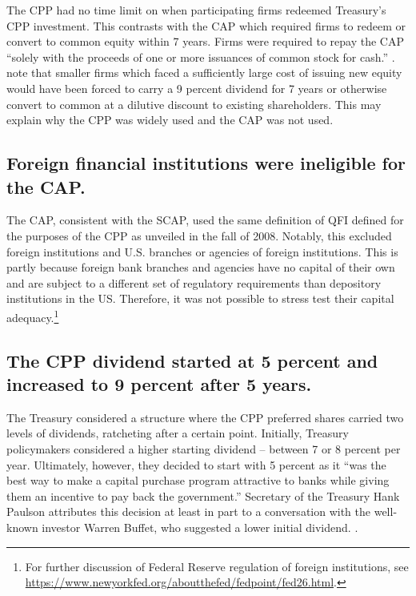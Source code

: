 \documentclass[12pt]{article}
\begin{document}
The CPP had no time limit on when participating firms redeemed Treasury's CPP investment. This contrasts with the CAP which required firms to redeem or convert to common equity within 7 years. Firms were required to repay the CAP ``solely with the proceeds of one or more issuances of common stock for cash.'' \citep{CAPTerms}. \citet{GW} note that smaller firms which faced a sufficiently large cost of issuing new equity would have been forced to carry a 9 percent dividend for 7 years or otherwise convert to common at a dilutive discount to existing shareholders. This may explain why the CPP was widely used and the CAP was not used.

\subsection{Foreign financial institutions were ineligible for the CAP.}

The CAP, consistent with the SCAP, used the same definition of QFI defined for the purposes of the CPP as unveiled in the fall of 2008. Notably, this excluded foreign institutions and U.S. branches or agencies of foreign institutions. This is partly because foreign bank branches and agencies have no capital of their own and are subject to a different set of regulatory requirements than depository institutions in the US. Therefore, it was not possible to stress test their capital adequacy.\footnote{For further discussion of Federal Reserve regulation of foreign institutions, see \url{https://www.newyorkfed.org/aboutthefed/fedpoint/fed26.html}.}

\subsection{The CPP dividend started at 5 percent and increased to 9 percent after 5 years.}

The Treasury considered a structure where the CPP preferred shares carried two levels of dividends, ratcheting after a certain point. Initially, Treasury policymakers considered a higher starting dividend -- between 7 or 8 percent per year. Ultimately, however, they decided to start with 5 percent as it ``was the best way to make a capital purchase program attractive to banks while giving them an incentive to pay back the government.'' Secretary of the Treasury Hank Paulson attributes this decision at least in part to a conversation with the well-known investor Warren Buffet, who suggested a lower initial dividend. \citep{paulsonbook}.
\end{document}
